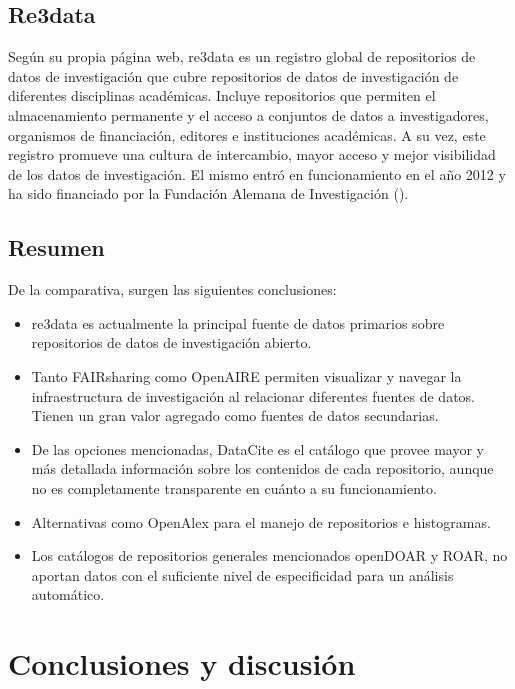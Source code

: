 \documentclass{article}
\begin{document}
\subsection{Re3data}
Según su propia página web, re3data es un registro global de repositorios de datos de investigación que cubre repositorios de datos de investigación de diferentes disciplinas académicas. 
Incluye repositorios que permiten el almacenamiento permanente y el acceso a conjuntos de datos a investigadores, organismos de financiación, editores e instituciones académicas. A su vez, este registro promueve una cultura de intercambio, mayor acceso y mejor visibilidad de los datos de investigación. 
El mismo entró en funcionamiento en el año 2012 y ha sido financiado por la Fundación Alemana de Investigación (\cite{dfg2023}).

\subsection{Resumen}
De la comparativa, surgen las siguientes conclusiones:
\begin{itemize}
    \item re3data es actualmente la principal fuente de datos primarios sobre repositorios de datos de investigación abierto.
    \item Tanto FAIRsharing como OpenAIRE permiten visualizar y navegar la infraestructura de investigación al relacionar diferentes fuentes de datos. Tienen un gran valor agregado como fuentes de datos secundarias.
    \item De las opciones mencionadas, DataCite es el catálogo que provee mayor y más detallada información sobre los contenidos de cada repositorio, aunque no es completamente transparente en cuánto a su funcionamiento.
    \item Alternativas como OpenAlex para el manejo de repositorios e histogramas.
    \item Los catálogos de repositorios generales mencionados openDOAR y ROAR, no aportan datos con el suficiente nivel de especificidad para un análisis automático.
\end{itemize}

\section{Conclusiones y discusión}
\end{document}
